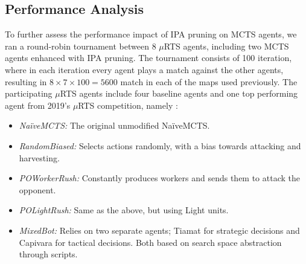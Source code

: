 \documentclass[conference]{IEEEtran}
\newcommand{\mRTS}{$\mu$RTS}
\begin{document}
\begin{table}[!h]
\renewcommand{\arraystretch}{1.3}
\caption{Best Performing Pruning Approaches}
\label{bestApproaches}
\centering
{}
\end{table}


\subsection{Performance Analysis}

To further assess the performance impact of IPA pruning on MCTS agents, we ran a round-robin tournament between 8 \mRTS{} agents, including two MCTS agents enhanced with IPA pruning. The tournament consists of 100 iteration, where in each iteration every agent plays a match against the other agents, resulting in $8\times7\times100 = 5600$ match in each of the maps used previously. The participating \mRTS{} agents include four baseline agents and one top performing agent from 2019's \mRTS{} competition, namely :

\begin{itemize}
\item \textit{NaïveMCTS:} The original unmodified NaïveMCTS.
\item \textit{RandomBiased:} Selects actions randomly, with a bias towards attacking and harvesting.
\item \textit{POWorkerRush:} Constantly produces workers and sends them to attack the opponent.
\item \textit{POLightRush:} Same as the above, but using Light units.
\item \textit{MixedBot:} Relies on two separate agents; Tiamat\cite{marino_evolving_2018} for strategic decisions and Capivara\cite{moraes_action_2018} for tactical decisions. Both based on search space abstraction through scripts.
\end{itemize}
\end{document}
